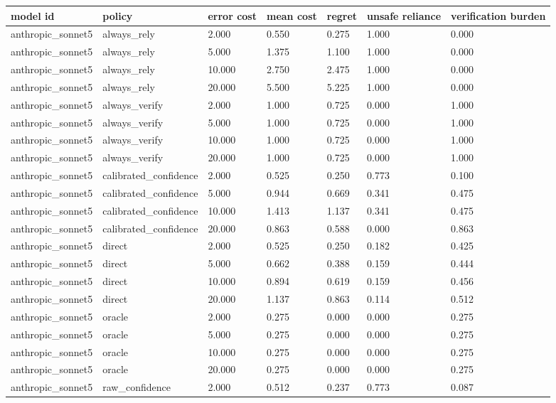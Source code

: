 \begin{tabular}{lllllll}
\toprule
model id & policy & error cost & mean cost & regret & unsafe reliance & verification burden \\
\midrule
anthropic\_sonnet5 & always\_rely & 2.000 & 0.550 & 0.275 & 1.000 & 0.000 \\
anthropic\_sonnet5 & always\_rely & 5.000 & 1.375 & 1.100 & 1.000 & 0.000 \\
anthropic\_sonnet5 & always\_rely & 10.000 & 2.750 & 2.475 & 1.000 & 0.000 \\
anthropic\_sonnet5 & always\_rely & 20.000 & 5.500 & 5.225 & 1.000 & 0.000 \\
anthropic\_sonnet5 & always\_verify & 2.000 & 1.000 & 0.725 & 0.000 & 1.000 \\
anthropic\_sonnet5 & always\_verify & 5.000 & 1.000 & 0.725 & 0.000 & 1.000 \\
anthropic\_sonnet5 & always\_verify & 10.000 & 1.000 & 0.725 & 0.000 & 1.000 \\
anthropic\_sonnet5 & always\_verify & 20.000 & 1.000 & 0.725 & 0.000 & 1.000 \\
anthropic\_sonnet5 & calibrated\_confidence & 2.000 & 0.525 & 0.250 & 0.773 & 0.100 \\
anthropic\_sonnet5 & calibrated\_confidence & 5.000 & 0.944 & 0.669 & 0.341 & 0.475 \\
anthropic\_sonnet5 & calibrated\_confidence & 10.000 & 1.413 & 1.137 & 0.341 & 0.475 \\
anthropic\_sonnet5 & calibrated\_confidence & 20.000 & 0.863 & 0.588 & 0.000 & 0.863 \\
anthropic\_sonnet5 & direct & 2.000 & 0.525 & 0.250 & 0.182 & 0.425 \\
anthropic\_sonnet5 & direct & 5.000 & 0.662 & 0.388 & 0.159 & 0.444 \\
anthropic\_sonnet5 & direct & 10.000 & 0.894 & 0.619 & 0.159 & 0.456 \\
anthropic\_sonnet5 & direct & 20.000 & 1.137 & 0.863 & 0.114 & 0.512 \\
anthropic\_sonnet5 & oracle & 2.000 & 0.275 & 0.000 & 0.000 & 0.275 \\
anthropic\_sonnet5 & oracle & 5.000 & 0.275 & 0.000 & 0.000 & 0.275 \\
anthropic\_sonnet5 & oracle & 10.000 & 0.275 & 0.000 & 0.000 & 0.275 \\
anthropic\_sonnet5 & oracle & 20.000 & 0.275 & 0.000 & 0.000 & 0.275 \\
anthropic\_sonnet5 & raw\_confidence & 2.000 & 0.512 & 0.237 & 0.773 & 0.087 \\

\end{tabular}
